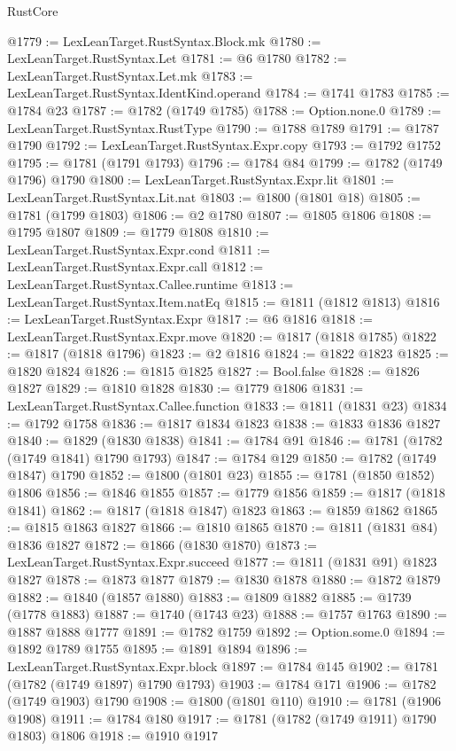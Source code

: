 \begin{lexlean}{RustCore}
\begin{coremodule}
@1779 := LexLeanTarget.RustSyntax.Block.mk
@1780 := LexLeanTarget.RustSyntax.Let
@1781 := @6 @1780
@1782 := LexLeanTarget.RustSyntax.Let.mk
@1783 := LexLeanTarget.RustSyntax.IdentKind.operand
@1784 := @1741 @1783
@1785 := @1784 @23
@1787 := @1782 (@1749 @1785)
@1788 := Option.none.{0}
@1789 := LexLeanTarget.RustSyntax.RustType
@1790 := @1788 @1789
@1791 := @1787 @1790
@1792 := LexLeanTarget.RustSyntax.Expr.copy
@1793 := @1792 @1752
@1795 := @1781 (@1791 @1793)
@1796 := @1784 @84
@1799 := @1782 (@1749 @1796) @1790
@1800 := LexLeanTarget.RustSyntax.Expr.lit
@1801 := LexLeanTarget.RustSyntax.Lit.nat
@1803 := @1800 (@1801 @18)
@1805 := @1781 (@1799 @1803)
@1806 := @2 @1780
@1807 := @1805 @1806
@1808 := @1795 @1807
@1809 := @1779 @1808
@1810 := LexLeanTarget.RustSyntax.Expr.cond
@1811 := LexLeanTarget.RustSyntax.Expr.call
@1812 := LexLeanTarget.RustSyntax.Callee.runtime
@1813 := LexLeanTarget.RustSyntax.Item.natEq
@1815 := @1811 (@1812 @1813)
@1816 := LexLeanTarget.RustSyntax.Expr
@1817 := @6 @1816
@1818 := LexLeanTarget.RustSyntax.Expr.move
@1820 := @1817 (@1818 @1785)
@1822 := @1817 (@1818 @1796)
@1823 := @2 @1816
@1824 := @1822 @1823
@1825 := @1820 @1824
@1826 := @1815 @1825
@1827 := Bool.false
@1828 := @1826 @1827
@1829 := @1810 @1828
@1830 := @1779 @1806
@1831 := LexLeanTarget.RustSyntax.Callee.function
@1833 := @1811 (@1831 @23)
@1834 := @1792 @1758
@1836 := @1817 @1834 @1823
@1838 := @1833 @1836 @1827
@1840 := @1829 (@1830 @1838)
@1841 := @1784 @91
@1846 := @1781 (@1782 (@1749 @1841) @1790 @1793)
@1847 := @1784 @129
@1850 := @1782 (@1749 @1847) @1790
@1852 := @1800 (@1801 @23)
@1855 := @1781 (@1850 @1852) @1806
@1856 := @1846 @1855
@1857 := @1779 @1856
@1859 := @1817 (@1818 @1841)
@1862 := @1817 (@1818 @1847) @1823
@1863 := @1859 @1862
@1865 := @1815 @1863 @1827
@1866 := @1810 @1865
@1870 := @1811 (@1831 @84) @1836 @1827
@1872 := @1866 (@1830 @1870)
@1873 := LexLeanTarget.RustSyntax.Expr.succeed
@1877 := @1811 (@1831 @91) @1823 @1827
@1878 := @1873 @1877
@1879 := @1830 @1878
@1880 := @1872 @1879
@1882 := @1840 (@1857 @1880)
@1883 := @1809 @1882
@1885 := @1739 (@1778 @1883)
@1887 := @1740 (@1743 @23)
@1888 := @1757 @1763
@1890 := @1887 @1888 @1777
@1891 := @1782 @1759
@1892 := Option.some.{0}
@1894 := @1892 @1789 @1755
@1895 := @1891 @1894
@1896 := LexLeanTarget.RustSyntax.Expr.block
@1897 := @1784 @145
@1902 := @1781 (@1782 (@1749 @1897) @1790 @1793)
@1903 := @1784 @171
@1906 := @1782 (@1749 @1903) @1790
@1908 := @1800 (@1801 @110)
@1910 := @1781 (@1906 @1908)
@1911 := @1784 @180
@1917 := @1781 (@1782 (@1749 @1911) @1790 @1803) @1806
@1918 := @1910 @1917

\end{coremodule}
\end{lexlean}
